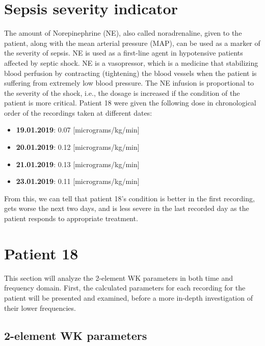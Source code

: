\section{Sepsis severity indicator}\label{sect:sepsis_severity}
The amount of Norepinephrine (NE), also called noradrenaline, given to the patient, along with the mean arterial pressure (MAP), can be used as a marker of the severity of sepsis. NE is used as a first-line agent in hypotensive patients affected by septic shock. NE is a vasopressor, which is a medicine that stabilizing blood perfusion by contracting (tightening) the blood vessels when the patient is suffering from extremely low blood pressure. \cite{RN20} The NE infusion is proportional to the severity of the shock, i.e., the dosage is increased if the condition of the patient is more critical. Patient 18 were given the following dose in chronological order of the recordings taken at different dates: 
\begin{itemize}
    \itemsep0em
    \item \textbf{19.01.2019}: 0.07 [micrograms/kg/min]
    \item \textbf{20.01.2019}: 0.12 [micrograms/kg/min]
    \item \textbf{21.01.2019}: 0.13 [micrograms/kg/min]
    \item \textbf{23.01.2019}: 0.11 [micrograms/kg/min]
\end{itemize}
From this, we can tell that patient 18's condition is better in the first recording, gets worse the next two days, and is less severe in the last recorded day as the patient responds to appropriate treatment.



\section{Patient 18}

This section will analyze the 2-element WK parameters in both time and frequency domain. First, the calculated parameters for each recording for the patient will be presented and examined, before a more in-depth investigation of their lower frequencies.


\subsection{2-element WK parameters}\label{sect:WKparameters}


